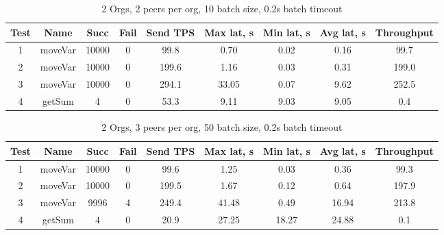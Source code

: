 \begin{appendices}
\begin{table}[h!]
\begin{center}
\begin{tabular}{ |c|c|c|c|c|c|c|c|c| }
 \hline
  Test & Name & Succ  & Fail & Send TPS & Max lat, s & Min lat, s & Avg lat, s & Throughput \\
 \hline
 \hline
 1    & moveVar & 10000 & 0    & 99.8  & 0.70      & 0.02      & 0.16      & 99.7 \\
 \hline
 2    & moveVar & 10000 & 0    & 199.6 & 1.16      & 0.03      & 0.31      & 199.0 \\
 \hline
 3    & moveVar & 10000 & 0    & 294.1 & 33.05     & 0.07      & 9.62      & 252.5 \\
 \hline
 4    & getSum  & 4     & 0    & 53.3  & 9.11      & 9.03      & 9.05      & 0.4 \\
 \hline
\end{tabular}
\end{center}
\caption{2 Orgs, 2 peers per org, 10 batch size, 0.2s batch timeout}
\end{table}

\begin{table}[h!]
\begin{center}
\begin{tabular}{ |c|c|c|c|c|c|c|c|c| }
 \hline
  Test & Name & Succ  & Fail & Send TPS & Max lat, s & Min lat, s & Avg lat, s & Throughput \\
 \hline
 \hline
 1    & moveVar & 10000 & 0    & 99.6  & 1.25       & 0.03       & 0.36       & 99.3  \\
 \hline
 2    & moveVar & 10000 & 0    & 199.5 & 1.67       & 0.12       & 0.64       & 197.9 \\
 \hline
 3    & moveVar & 9996  & 4    & 249.4 & 41.48      & 0.49       & 16.94      & 213.8 \\
 \hline
 4    & getSum  & 4     & 0    & 20.9  & 27.25      & 18.27      & 24.88      & 0.1   \\
 \hline
\end{tabular}
\end{center}
\caption{2 Orgs, 3 peers per org, 50 batch size, 0.2s batch timeout}
\end{table}


\end{appendices}
